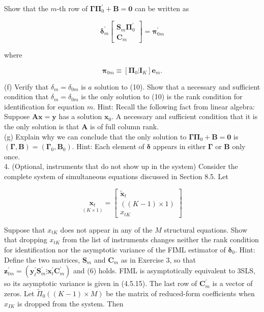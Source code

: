 \documentclass[10pt]{article}
\begin{document}
Show that the $m$-th row of $\boldsymbol{\Gamma} \boldsymbol{\Pi}_{0}^{\prime}+\mathbf{B}=\mathbf{0}$ can be written as

\[
\boldsymbol{\delta}_{m}^{\prime}\left[\begin{array}{c}
\mathbf{S}_{m} \boldsymbol{\Pi}_{0}^{\prime}  \tag{10}\\
\mathbf{C}_{m}
\end{array}\right]=\boldsymbol{\pi}_{0 m}^{\prime}
\]

where


\begin{equation*}
\boldsymbol{\pi}_{0 m} \equiv\left[\boldsymbol{\Pi}_{0} \vdots \mathbf{I}_{K}\right] \mathbf{e}_{m} . \tag{11}
\end{equation*}


(f) Verify that $\delta_{m}=\delta_{0 m}$ is $a$ solution to (10). Show that a necessary and sufficient condition that $\delta_{m}=\delta_{0 m}$ is the only solution to (10) is the rank condition for identification for equation $m$. Hint: Recall the following fact from linear algebra: Suppose $\mathbf{A x}=\mathbf{y}$ has a solution $\mathbf{x}_{0}$. A necessary and sufficient condition that it is the only solution is that $\mathbf{A}$ is of full column rank.\\
(g) Explain why we can conclude that the only solution to $\boldsymbol{\Gamma} \boldsymbol{\Pi}_{0}+\mathbf{B}=\mathbf{0}$ is $(\boldsymbol{\Gamma}, \mathbf{B})=\left(\boldsymbol{\Gamma}_{0}, \mathbf{B}_{0}\right)$. Hint: Each element of $\boldsymbol{\delta}$ appears in either $\boldsymbol{\Gamma}$ or $\mathbf{B}$ only once.\\
4. (Optional, instruments that do not show up in the system) Consider the complete system of simultaneous equations discussed in Section 8.5. Let

$$
\underset{(K \times 1)}{\mathbf{x}_{t}}=\left[\begin{array}{c}
\tilde{\mathbf{x}}_{t} \\
((K-1) \times 1) \\
x_{t K}
\end{array}\right]
$$

Suppose that $x_{t K}$ does not appear in any of the $M$ structural equations. Show that dropping $x_{t K}$ from the list of instruments changes neither the rank condition for identification nor the asymptotic variance of the FIML estimator of $\boldsymbol{\delta}_{0}$. Hint: Define the two matrices, $\mathbf{S}_{m}$ and $\mathbf{C}_{m}$ as in Exercise 3, so that $\mathbf{z}_{t m}^{\prime}=\left(\mathbf{y}_{t}^{\prime} \mathbf{S}_{m}^{\prime} \vdots \mathbf{x}_{t}^{\prime} \mathbf{C}_{m}^{\prime}\right)$ and (6) holds. FIML is asymptotically equivalent to 3SLS, so its asymptotic variance is given in (4.5.15). The last row of $\mathbf{C}_{m}^{\prime}$ is a vector of zeros. Let $\widetilde{\Pi}_{0}((K-1) \times M)$ be the matrix of reduced-form coefficients when $x_{I K}$ is dropped from the system. Then
\end{document}
